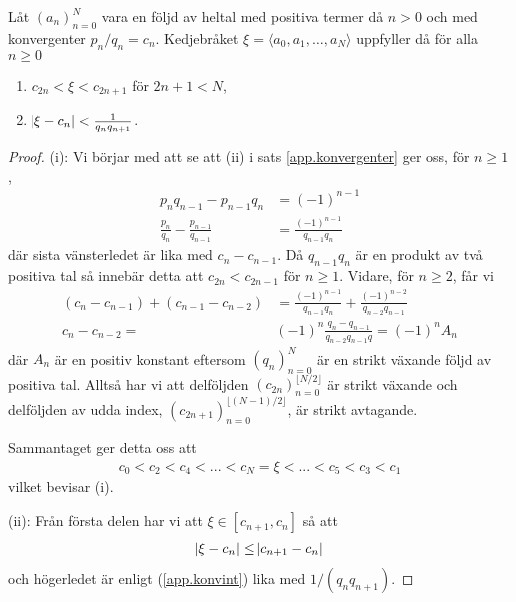 \begin{theorem} \label{app.kovfel}
    Låt \((a_n)_{n=0}^{N}\) vara en följd av heltal med positiva termer då \(n > 0\) och med konvergenter \(p_n / q_n = c_n\). Kedjebråket \(\xi = \langle a_0, a_1, \dots, a_N \rangle\) uppfyller då för alla \(n \geq 0\)
    \begin{enumerate}
        \item \(c_{2n} < \xi < c_{2n + 1}\) \quad för $2n + 1 < N$,
        \item \(\abs{\xi - c_n} < \frac{1}{q_n q_{n + 1}}\). 
    \end{enumerate}
\end{theorem}
\begin{proof}
    (i): Vi börjar med att se att (ii) i sats \ref{app.konvergenter} ger oss, för $n \geq 1$,
    \begin{align}
        p_n q_{n-1} - p_{n-1} q_{n} &= (-1)^{n-1} \nonumber \\
        \frac{p_n}{q_n} - \frac{p_{n-1}}{q_{n-1}} &= \frac{(-1)^{n-1}}{q_{n-1} q_n} \label{app.konvint}
    \end{align}
    där sista vänsterledet är lika med \(c_{n} - c_{n-1}\). Då \(q_{n-1} q_n\) är en produkt av två positiva tal så innebär detta att \(c_{2n} < c_{2n-1}\) för \(n \geq 1\). Vidare, för $n \geq 2$, får vi
    \begin{align*}
        (c_n - c_{n-1}) + (c_{n-1} - c_{n-2}) &= \frac{(-1)^{n-1}}{q_{n-1} q_n} + \frac{(-1)^{n-2}}{q_{n-2} q_{n-1}}  \\
        c_n - c_{n-2} =& (-1)^n \frac{q_n - q_{n - 1}}{q_{n-2}q_{n-1}q} = (-1)^{n} A_n 
    \end{align*}
    där $A_n$ är en positiv konstant eftersom $(q_n)_{n=0}^N$ är en strikt växande följd av positiva tal. Alltså har vi att delföljden \((c_{2n})_{n = 0}^{\lfloor N/2 \rfloor}\) är strikt växande och delföljden av udda index, \((c_{2n + 1})_{n = 0}^{\lfloor (N - 1)/2 \rfloor}\), är strikt avtagande. 
    
    Sammantaget ger detta oss att
    \begin{align*}
        c_0 < c_2 < c_4 < ... < c_N = \xi < ... < c_5 < c_3 < c_1
    \end{align*}
    vilket bevisar (i).
    
    (ii): Från första delen har vi att \(\xi \in [c_{n+1}, c_n]\) så att
    \begin{align*}
        \abs{\xi - c_n} \leq \abs{c_{n+1} - c_n} 
    \end{align*}
    och högerledet är enligt (\ref{app.konvint}) lika med \(1 / (q_n q_{n+1})\). 
\end{proof}

